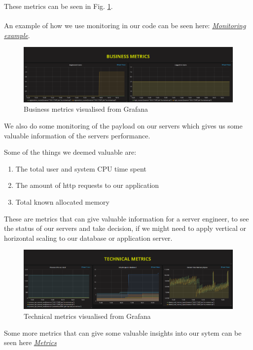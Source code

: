 \documentclass[10pt]{article}
\begin{document}
These metrics can be seen in Fig. \ref{fig:monitoring}. 
\\
\\
An example of how we use monitoring in our code can be seen here: \href{https://github.com/Arklaide/devopsITUproject/blob/main/MinitweetApi/Controllers/UsersController.cs}{\textit{Monitoring example}}.


\begin{figure}[h]
    \centering
    \includegraphics[width=\textwidth]{images/monitoringbusiness.PNG}
    \caption{Business metrics visualised from Grafana}
    \label{fig:monitoring}
\end{figure}
  
We also do some monitoring of the payload on our servers which gives us some valuable information of the servers performance.

Some of the things we deemed valuable are:
\begin{enumerate}
    \item The total user and system CPU time spent
    \item The amount of http requests to our application
    \item Total known allocated memory
\end{enumerate}

These are metrics that can give valuable information for a server engineer, to see the status of our servers and take decision, if we might need to apply vertical or horizontal scaling to our database or application server.

\begin{figure}[h]
    \centering
    \includegraphics[width=\textwidth]{images/monitoring technical.PNG}
    \caption{Technical metrics visualised from Grafana}
    \label{fig:monitoringtechnical}
\end{figure}
Some more metrics that can give some valuable insights into our sytem can be seen here \href{https://github.com/Arklaide/devopsITUproject/blob/main/report/sub-reports/METRICS.md}{\textit{Metrics}} 
\end{document}
